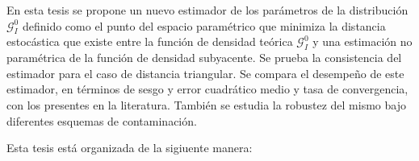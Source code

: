 En esta tesis se propone un nuevo  estimador de los parámetros de la distribución $\mathcal{G}_I^0$ definido como el punto del espacio paramétrico que minimiza la distancia estocástica que existe entre la función de densidad teórica $\mathcal{G}_I^0$ y una estimación no paramétrica de la función de densidad subyacente. Se prueba la consistencia del estimador para el caso de distancia triangular. Se compara el desempeño de este estimador, en términos de sesgo y error cuadrático medio y tasa de convergencia, con los presentes en la literatura. También se estudia la robustez del mismo bajo diferentes esquemas de contaminación.

Esta tesis está organizada de la sigiuente manera:

